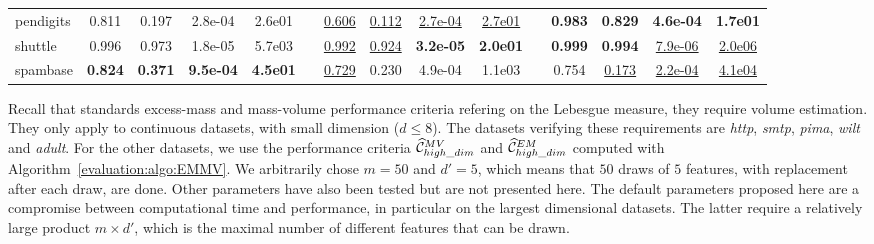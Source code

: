 \begin{table}[!ht]
{\begin{tabular}{l cccc c cccc c cccc}
pendigits    &0.811 &0.197 &2.8e-04&2.6e01 & &\underline{0.606} &\underline{0.112} &\underline{2.7e-04}&\underline{2.7e01}   & &\bf 0.983 &\bf 0.829 &\bf 4.6e-04&\bf 1.7e01 \\
shuttle      &0.996 &0.973 &1.8e-05&5.7e03 & &\underline{0.992} &\underline{0.924} &\bf 3.2e-05&\bf 2.0e01   & &\bf 0.999 &\bf 0.994 &\underline{7.9e-06}&\underline{2.0e06} \\
spambase     &\bf 0.824 &\bf 0.371 &\bf 9.5e-04&\bf 4.5e01&  &\underline{0.729} &0.230 &4.9e-04&1.1e03  &  &0.754 &\underline{0.173} &\underline{2.2e-04}&\underline{4.1e04} \\
\bottomrule
\end{tabular}
}
\end{table}

Recall that standards excess-mass and mass-volume performance criteria refering on the Lebesgue measure, they require volume estimation. They only apply to continuous datasets, with small dimension ($d \le 8$). The datasets verifying these requirements are \emph{http}, \emph{smtp}, %
\emph{pima}, \emph{wilt} and \emph{adult}.
For the other datasets, we use the performance criteria $\widehat{\mathcal{C}}^{MV}_{high\_dim}$ and $\widehat{\mathcal{C}}^{EM}_{high\_dim}$ computed with Algorithm~\ref{evaluation:algo:EMMV}. We arbitrarily chose $m = 50$ and $d'=5$, which means that $50$ draws of $5$ features, with replacement after each draw, are done.
Other parameters have also been tested but are not presented here. The default parameters proposed here are a compromise between computational time and performance, in particular on the largest dimensional datasets. The latter require a relatively large product $m \times d'$, which is the maximal number of different features that can be drawn.


